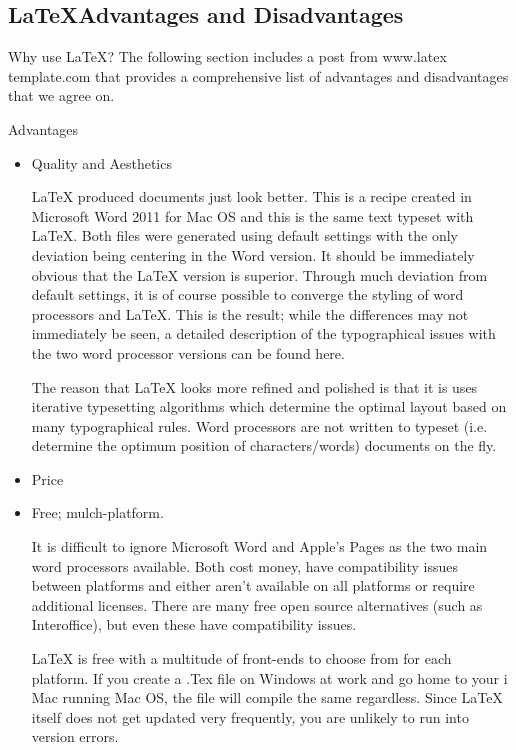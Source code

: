 \documentclass[12pt,letterpaper]{report}
\begin{document}
\subsection{\LaTeX Advantages and Disadvantages}
Why use LaTeX?
The following section includes a post from www.latex template.com that provides a comprehensive list of advantages and disadvantages that we agree on.

Advantages

\begin{itemize}

\item Quality and Aesthetics

LaTeX produced documents just look better. This is a recipe created in Microsoft Word 2011 for Mac OS and this is the same text typeset with LaTeX. Both files were generated using default settings with the only deviation being centering in the Word version. It should be immediately obvious that the LaTeX version is superior. Through much deviation from default settings, it is of course possible to converge the styling of word processors and LaTeX. This is the result; while the differences may not immediately be seen, a detailed description of the typographical issues with the two word processor versions can be found here.

The reason that LaTeX looks more refined and polished is that it is uses iterative typesetting algorithms which determine the optimal layout based on many typographical rules. Word processors are not written to typeset (i.e. determine the optimum position of characters/words) documents on the fly.

\item Price

\item Free; mulch-platform.

It is difficult to ignore Microsoft Word and Apple's Pages as the two main word processors available. Both cost money, have compatibility issues between platforms and either aren't available on all platforms or require additional licenses. There are many free open source alternatives (such as Interoffice), but even these have compatibility issues.

LaTeX is free with a multitude of front-ends to choose from for each platform. If you create a .Tex file on Windows at work and go home to your i Mac running Mac OS, the file will compile the same regardless. Since LaTeX itself does not get updated very frequently, you are unlikely to run into version errors.


\end{itemize}
\end{document}
